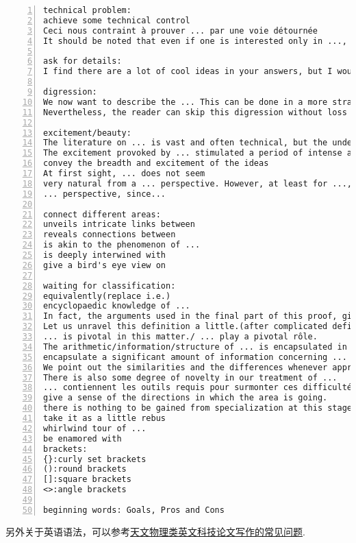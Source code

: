 \documentclass[11pt]{amsart}
\begin{document}
\begin{lstlisting}[numbers=left,numberstyle=\tiny,numbersep=10pt]
technical problem:
achieve some technical control
Ceci nous contraint à prouver ... par une voie détournée
It should be noted that even if one is interested only in ..., the proofs often involve more general ...

ask for details:
I find there are a lot of cool ideas in your answers, but I would be grateful if you could be a bit more precise.

digression:
We now want to describe the ... This can be done in a more straightforward way, but we prefer to include a short digression in ... theory as this allows us to mention a general fact which is in the background of a later construction anyhow.
Nevertheless, the reader can skip this digression without loss of continuity and continue with ... instead.

excitement/beauty:
The literature on ... is vast and often technical, but the underlying ideas are possessing of an undeniable beauty.
The excitement provoked by ... stimulated a period of intense and widespread activity.
convey the breadth and excitement of the ideas
At first sight, ... does not seem
very natural from a ... perspective. However, at least for ..., ... is important from
... perspective, since...

connect different areas:
unveils intricate links between
reveals connections between
is akin to the phenomenon of ...
is deeply interwined with
give a bird's eye view on

waiting for classification:
equivalently(replace i.e.)
encyclopaedic knowledge of ...
In fact, the arguments used in the final part of this proof, give the following result.
Let us unravel this definition a little.(after complicated definition)
... is pivotal in this matter./ ... play a pivotal rôle. 
The arithmetic/information/structure of ... is encapsulated in ...
encapsulate a significant amount of information concerning ...
We point out the similarities and the differences whenever appropriate.
There is also some degree of novelty in our treatment of ...
... contiennent les outils requis pour surmonter ces difficultés.
give a sense of the directions in which the area is going.
there is nothing to be gained from specialization at this stage
take it as a little rebus
whirlwind tour of ...
be enamored with
brackets:
{}:curly set brackets
():round brackets
[]:square brackets
<>:angle brackets

beginning words: Goals, Pros and Cons
\end{lstlisting}

另外关于英语语法，可以参考\href{https://arxiv.org/ftp/arxiv/papers/1011/1011.5973.pdf}{天文物理类英文科技论文写作的常见问题}.
\end{document}

